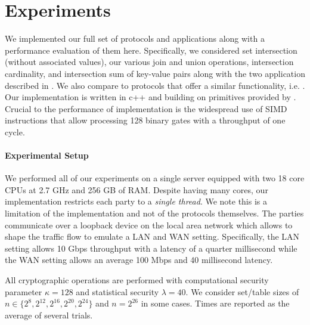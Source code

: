

\section{Experiments}\label{sec:eval}


We implemented our full set of protocols and applications along with a performance evaluation of them here. Specifically, we considered set intersection (without associated values), our various join and union operations, intersection cardinality, and intersection sum of key-value pairs along with the two application described in . We also compare to protocols that offer a similar functionality, i.e. \cite{CCS:KKRT16, PSWW18,ASIACCS:BlaAgu12,DBLP:conf/cans/CristofaroGT12,cryptoeprint:2017:738}. Our implementation is written in c++ and building on primitives provided by \cite{libOTe}. Crucial to the performance of implementation is the widespread use of SIMD instructions that allow processing 128 binary gates with a throughput of one cycle.



\paragraph{Experimental Setup} We performed all of our experiments on a single server equipped with two 18 core CPUs at 2.7 GHz and 256 GB of RAM. Despite having many cores, our implementation restricts each party to a \emph{single thread}. We note this is a limitation of the implementation  and not of the protocols themselves. The parties communicate over a loopback device on the local area network which allows to shape the traffic flow to emulate a LAN and WAN setting. Specifically, the LAN setting allows 10 Gbps throughput with a latency of a quarter millisecond while the WAN setting allows an average 100 Mbps and 40 millisecond latency.

All cryptographic operations are performed with computational security parameter $\kappa=128$ and statistical security $\lambda=40$. We consider set/table sizes of $n\in\{2^8, 2^{12}, 2^{16}, 2^{20}, 2^{24}\}$ and $n=2^{26}$ in some cases. Times are reported as the average of several trials.

